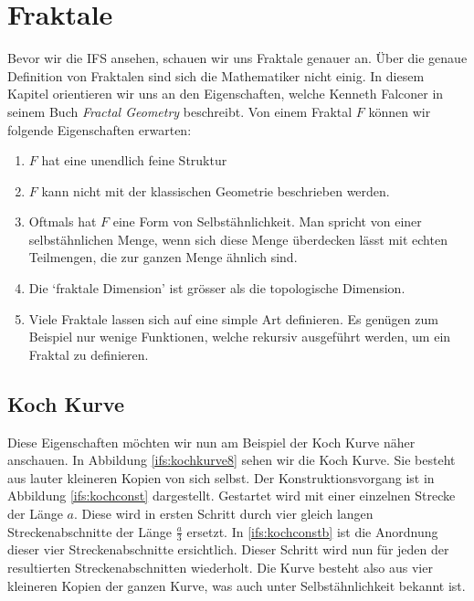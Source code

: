%
%
%
\section{Fraktale
\label{ifs:section:teil1}}
Bevor wir die IFS ansehen, schauen wir uns Fraktale genauer an.
Über die genaue Definition von Fraktalen sind sich die Mathematiker nicht einig. 
In diesem Kapitel orientieren wir uns an den Eigenschaften, welche Kenneth Falconer in seinem Buch {\em Fractal Geometry} \cite{ifs:fractal-geometry} beschreibt.
Von einem Fraktal $F$ können wir folgende Eigenschaften erwarten: 
\begin{enumerate}
	\item $F$ hat eine unendlich feine Struktur
	\item $F$ kann nicht mit der klassischen Geometrie beschrieben werden.
	\item Oftmals hat $F$ eine Form von Selbstähnlichkeit.
	Man spricht von einer selbstähnlichen Menge, wenn sich diese Menge überdecken lässt mit echten Teilmengen, die zur ganzen Menge ähnlich sind.
	\item Die `fraktale Dimension' ist grösser als die topologische Dimension.
	\item Viele Fraktale lassen sich auf eine simple Art definieren. Es genügen zum Beispiel nur wenige Funktionen, welche rekursiv ausgeführt werden, um ein Fraktal zu definieren.  
\end{enumerate}
\subsection{Koch Kurve
	\label{ifs:subsection:lilkoch}}
Diese Eigenschaften möchten wir nun am Beispiel der Koch Kurve näher anschauen.
In Abbildung \ref{ifs:kochkurve8} sehen wir die Koch Kurve. Sie besteht aus lauter kleineren Kopien von sich selbst. 
Der Konstruktionsvorgang ist in Abbildung \ref{ifs:kochconst} dargestellt.
Gestartet wird mit einer einzelnen Strecke der Länge $a$.
Diese wird in ersten Schritt durch vier gleich langen Streckenabschnitte der Länge $\frac{a}{3}$ ersetzt.
In \ref{ifs:kochconstb} ist die Anordnung dieser vier Streckenabschnitte ersichtlich. 
Dieser Schritt wird nun für jeden der resultierten Streckenabschnitten wiederholt.
Die Kurve besteht also aus vier kleineren Kopien der ganzen Kurve, was auch unter Selbstähnlichkeit bekannt ist.


